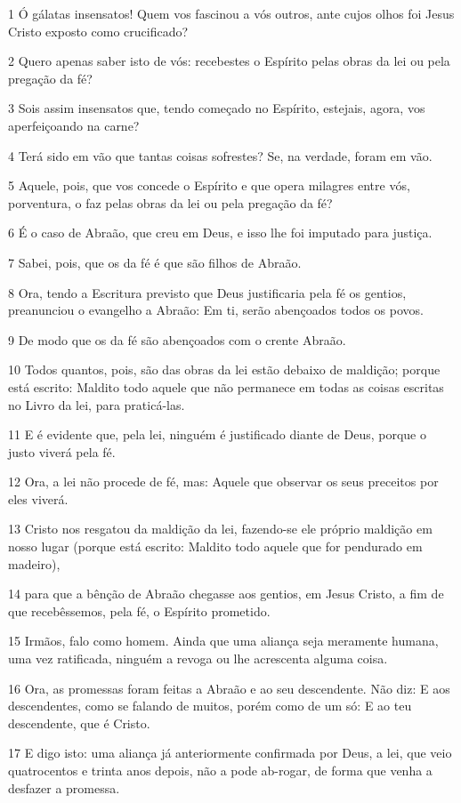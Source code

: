 \par 1 Ó gálatas insensatos! Quem vos fascinou a vós outros, ante cujos olhos foi Jesus Cristo exposto como crucificado?
\par 2 Quero apenas saber isto de vós: recebestes o Espírito pelas obras da lei ou pela pregação da fé?
\par 3 Sois assim insensatos que, tendo começado no Espírito, estejais, agora, vos aperfeiçoando na carne?
\par 4 Terá sido em vão que tantas coisas sofrestes? Se, na verdade, foram em vão.
\par 5 Aquele, pois, que vos concede o Espírito e que opera milagres entre vós, porventura, o faz pelas obras da lei ou pela pregação da fé?
\par 6 É o caso de Abraão, que creu em Deus, e isso lhe foi imputado para justiça.
\par 7 Sabei, pois, que os da fé é que são filhos de Abraão.
\par 8 Ora, tendo a Escritura previsto que Deus justificaria pela fé os gentios, preanunciou o evangelho a Abraão: Em ti, serão abençoados todos os povos.
\par 9 De modo que os da fé são abençoados com o crente Abraão.
\par 10 Todos quantos, pois, são das obras da lei estão debaixo de maldição; porque está escrito: Maldito todo aquele que não permanece em todas as coisas escritas no Livro da lei, para praticá-las.
\par 11 E é evidente que, pela lei, ninguém é justificado diante de Deus, porque o justo viverá pela fé.
\par 12 Ora, a lei não procede de fé, mas: Aquele que observar os seus preceitos por eles viverá.
\par 13 Cristo nos resgatou da maldição da lei, fazendo-se ele próprio maldição em nosso lugar (porque está escrito: Maldito todo aquele que for pendurado em madeiro),
\par 14 para que a bênção de Abraão chegasse aos gentios, em Jesus Cristo, a fim de que recebêssemos, pela fé, o Espírito prometido.
\par 15 Irmãos, falo como homem. Ainda que uma aliança seja meramente humana, uma vez ratificada, ninguém a revoga ou lhe acrescenta alguma coisa.
\par 16 Ora, as promessas foram feitas a Abraão e ao seu descendente. Não diz: E aos descendentes, como se falando de muitos, porém como de um só: E ao teu descendente, que é Cristo.
\par 17 E digo isto: uma aliança já anteriormente confirmada por Deus, a lei, que veio quatrocentos e trinta anos depois, não a pode ab-rogar, de forma que venha a desfazer a promessa.
